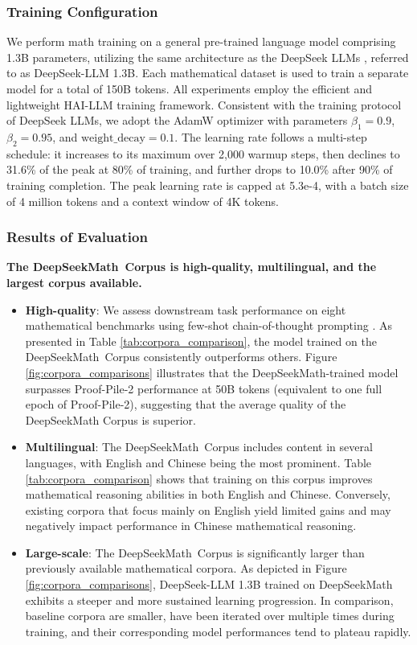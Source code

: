\subsubsection{Training Configuration}
\label{sec:quality-policy}
We perform math training on a general pre-trained language model comprising 1.3B parameters, utilizing the same architecture as the DeepSeek LLMs \citep{deepseek-llm}, referred to as DeepSeek-LLM 1.3B. Each mathematical dataset is used to train a separate model for a total of 150B tokens. All experiments employ the efficient and lightweight HAI-LLM \citep{haillm} training framework. Consistent with the training protocol of DeepSeek LLMs, we adopt the AdamW optimizer \citep{adamW} with parameters $\beta_1=0.9$, $\beta_2=0.95$, and $\mathrm{weight\_decay}=0.1$. The learning rate follows a multi-step schedule: it increases to its maximum over 2,000 warmup steps, then declines to 31.6\% of the peak at 80\% of training, and further drops to 10.0\% after 90\% of training completion. The peak learning rate is capped at 5.3e-4, with a batch size of 4 million tokens and a context window of 4K tokens.

\subsubsection{Results of Evaluation}

\textbf{The DeepSeekMath~Corpus is high-quality, multilingual, and the largest corpus available.}

\begin{itemize}[topsep=0pt]
    \item \textbf{High-quality}:
    We assess downstream task performance on eight mathematical benchmarks using few-shot chain-of-thought prompting \cite{cot}. As presented in Table \ref{tab:corpora_comparison}, the model trained on the DeepSeekMath~Corpus consistently outperforms others. Figure \ref{fig:corpora_comparisons} illustrates that the DeepSeekMath-trained model surpasses Proof-Pile-2 performance at 50B tokens (equivalent to one full epoch of Proof-Pile-2), suggesting that the average quality of the DeepSeekMath Corpus is superior.
    \item \textbf{Multilingual}:
    The DeepSeekMath~Corpus includes content in several languages, with English and Chinese being the most prominent. Table \ref{tab:corpora_comparison} shows that training on this corpus improves mathematical reasoning abilities in both English and Chinese. Conversely, existing corpora that focus mainly on English yield limited gains and may negatively impact performance in Chinese mathematical reasoning.
    \item \textbf{Large-scale}:
    The DeepSeekMath~Corpus is significantly larger than previously available mathematical corpora. As depicted in Figure \ref{fig:corpora_comparisons}, DeepSeek-LLM 1.3B trained on DeepSeekMath exhibits a steeper and more sustained learning progression. In comparison, baseline corpora are smaller, have been iterated over multiple times during training, and their corresponding model performances tend to plateau rapidly.
\end{itemize}

